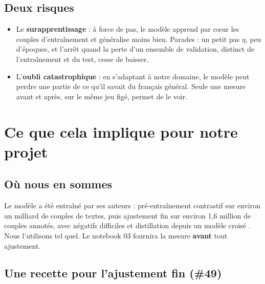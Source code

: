 \subsection{Deux risques}

\begin{itemize}
\item Le \textbf{surapprentissage} : à force de pas, le modèle apprend par cœur les couples d'entraînement et
  généralise moins bien. Parades : un petit pas $\eta$, peu d'époques, et l'arrêt quand la perte d'un ensemble de
  validation, distinct de l'entraînement et du test, cesse de baisser.
\item L'\textbf{oubli catastrophique} : en s'adaptant à notre domaine, le modèle peut perdre une partie de ce qu'il
  savait du français général. Seule une mesure avant et après, sur le même jeu figé, permet de le voir.
\end{itemize}

\section{Ce que cela implique pour notre projet}

\subsection{Où nous en sommes}

Le modèle a été entraîné par ses auteurs : pré-entraînement contrastif sur environ un milliard de couples de textes,
puis ajustement fin sur environ 1,6 million de couples annotés, avec négatifs difficiles et distillation depuis un
modèle croisé \source. Nous l'utilisons tel quel. Le notebook 03 fournira la mesure \textbf{avant} tout ajustement.

\subsection{Une recette pour l'ajustement fin (\#49)}

